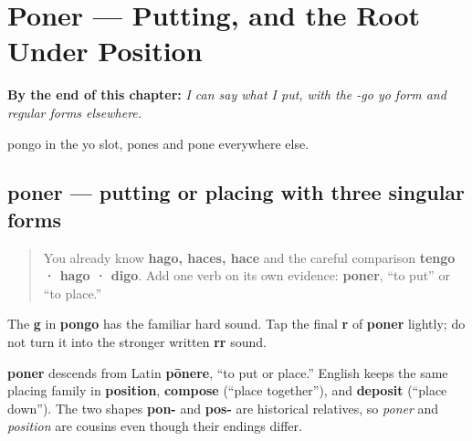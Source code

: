
\chapter{Poner --- Putting, and the Root Under Position}
\label{ch:spanish-poner}

\begin{chapteropening}
\textbf{By the end of this chapter:} \emph{I can say what I put, with the -go yo form and regular forms elsewhere.}

pongo in the yo slot, pones and pone everywhere else.
\end{chapteropening}

\section[poner]{poner — putting or placing with three singular forms}

\label{lesson:ES-C13-poner}



\begin{quote}
You already know \textbf{hago, haces, hace} and the careful comparison \textbf{tengo · hago · digo}. Add one verb on its own evidence: \textbf{poner}, “to put” or “to place.”
\end{quote}

\begin{sounds}
The \textbf{g} in \textbf{pongo} has the familiar hard sound. Tap the final \textbf{r} of \textbf{poner} lightly; do not turn it into the stronger written \textbf{rr} sound.
\end{sounds}

\begin{cousinweb}
\textbf{poner} descends from Latin \textbf{pōnere}, “to put or place.” English keeps the same placing family in \textbf{position}, \textbf{compose} (“place together”), and \textbf{deposit} (“place down”). The two shapes \textbf{pon-} and \textbf{pos-} are historical relatives, so \emph{poner} and \emph{position} are cousins even though their endings differ.
\end{cousinweb}

